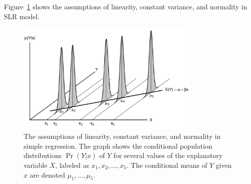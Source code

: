 Figure~\ref{fig:SLRdistribution} shows the assumptions of linearity, constant variance, and normality in SLR model.
\begin{figure}[H]
\begin{center}
  \includegraphics[width=0.8\textwidth]{Lecture6/Figure6-1.png}
  \caption{The assumptions of linearity, constant variance, and normality in simple regression.  The graph shows the conditional population distributions $\Pr(Y|x)$ of $Y$ for several values of the explanatory variable $X$, labeled as $x_1, x_2, \dots, x_5$.  The conditional means of $Y$ given $x$ are denoted $\mu_1, \dots, \mu_5$.}
  \label{fig:SLRdistribution}
\end{center}
\end{figure}

